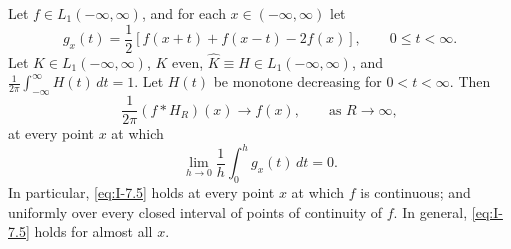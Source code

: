 \begin{theorem}\label{thm:I-9}
Let $f\in L_1(-\infty,\infty)$, and for each $x\in(-\infty,\infty)$ let
\begin{equation*}
g_x(t)=\frac12[f(x+t)+f(x-t)-2f(x)],\qquad 0\le t<\infty.
\end{equation*}
Let $K\in L_1(-\infty,\infty)$, $K$ even, $\hat K\equiv H\in L_1(-\infty,\infty)$, and $\frac{1}{2\pi}\int_{-\infty}^{\infty}H(t)\,dt=1$. Let $H(t)$ be monotone decreasing for $0<t<\infty$. Then
\begin{equation}\label{eq:I-7.5}
\frac{1}{2\pi}(f*H_R)(x)\to f(x),\qquad\text{as }R\to\infty,
\end{equation}
at every point $x$ at which
\begin{equation}\label{eq:I-7.6}
\lim_{h\to 0}\frac{1}{h}\int_0^h g_x(t)\,dt=0.
\end{equation}
In particular, \eqref{eq:I-7.5} holds at every point $x$ at which $f$ is continuous; and uniformly over every closed interval of points of continuity of $f$. In general, \eqref{eq:I-7.5} holds for almost all $x$.
\end{theorem}

